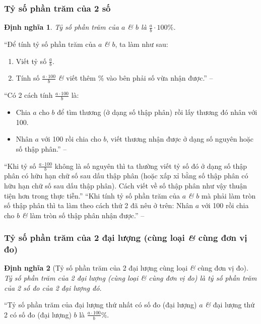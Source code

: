\documentclass[oneside]{book}
\numberwithin{equation}{section}
\newtheorem{dinhnghia}{Định nghĩa}[section]
\begin{document}
\subsubsection{Tỷ số phần trăm của 2 số}
\begin{dinhnghia}
	\emph{Tỷ số phần trăm} của $a$ \textit{\&} $b$ là $\frac{a}{b}\cdot 100\%$.
\end{dinhnghia}
``Để tính tỷ số phần trăm của $a$ \textit{\&} $b$, ta làm như sau:
\begin{enumerate}
	\item Viết tỷ số $\frac{a}{b}$.
	\item Tính số $\frac{a\cdot100}{b}$ \textit{\&} viết thêm $\%$ vào bên phải số vừa nhận được.'' -- \cite[p. 63]{Thai_Anh_Dat_Ha_Loan_Nam_Quang_Toan_6_tap_2}
\end{enumerate}
``Có 2 cách tính $\frac{a\cdot 100}{b}$ là:
\begin{itemize}
	\item Chia $a$ cho $b$ để tìm thương (ở dạng số thập phân) rồi lấy thương đó nhân với 100.
	\item Nhân $a$ với 100 rồi chia cho $b$, viết thương nhận được ở dạng số nguyên hoặc số thập phân.'' -- \cite[p. 63]{Thai_Anh_Dat_Ha_Loan_Nam_Quang_Toan_6_tap_2}
\end{itemize}
``Khi tỷ số $\frac{a\cdot 100}{b}$ không là số nguyên thì ta thường viết tỷ số đó ở dạng số thập phân có hữu hạn chữ số sau dấu thập phân (hoặc xấp xỉ bằng số thập phân có hữu hạn chữ số sau dấu thập phân). Cách viết về số thập phân như vậy thuận tiện hơn trong thực tiễn.'' ``Khi tính tỷ số phần trăm của $a$ \textit{\&} $b$ mà phải làm tròn số thập phân thì ta làm theo cách thứ 2 đã nêu ở trên: Nhân $a$ với 100 rồi chia cho $b$ \textit{\&} làm tròn số thập phân nhận được.'' -- \cite[p. 64]{Thai_Anh_Dat_Ha_Loan_Nam_Quang_Toan_6_tap_2}

\subsubsection{Tỷ số phần trăm của 2 đại lượng (cùng loại \textit{\&} cùng đơn vị đo)}
\begin{dinhnghia}[Tỷ số phần trăm của 2 đại lượng cùng loại \textit{\&} cùng đơn vị đo]
	 \emph{Tỷ số phần trăm của 2 đại lượng (cùng loại \textit{\&} cùng đơn vị đo)} là tỷ số phần trăm của 2 số đo của 2 đại lượng đó.
\end{dinhnghia}
``Tỷ số phần trăm của đại lượng thứ nhất có số đo (đại lượng) $a$ \textit{\&} đại lượng thứ 2 có số đo (đại lượng) $b$ là $\frac{a\cdot100}{b}\%$.
\end{document}
